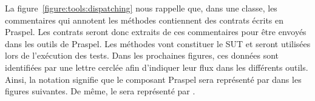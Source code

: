 La figure~\ref{figure:tools:dispatching} nous rappelle que, dans une classe, les
commentaires qui annotent les méthodes contiennent des contrats écrits en
Praspel. Les contrats seront donc extraits de ces commentaires pour être envoyés
dans les outils de Praspel. Les méthodes vont constituer le SUT et seront
utilisées lors de l'exécution des tests. Dans les prochaines figures, ces
données sont identifiées par une lettre cerclée afin d'indiquer leur flux dans
les différents outils. Ainsi, la notation %
signifie que le composant Praspel sera représenté par  dans les
figures suivantes. De même, le  sera représenté par
.

